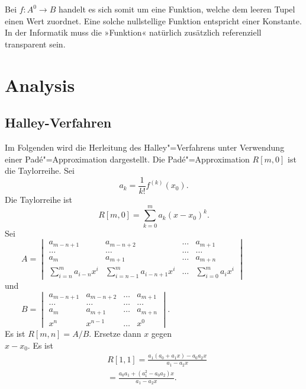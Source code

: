 \documentclass[a4paper,10pt,fleqn,twocolumn,twoside]{scrartcl}
\numberwithin{equation}{section}
\theoremstyle{rmbox}
\begin{document}
Bei $f\colon A^0\to B$ handelt es sich somit um eine Funktion, welche
dem leeren Tupel einen Wert zuordnet. Eine solche nullstellige
Funktion entspricht einer Konstante. In der Informatik muss die
»Funktion« natürlich zusätzlich referenziell transparent sein.

\section{Analysis}
\subsection{Halley-Verfahren}
Im Folgenden wird die Herleitung des Halley"=Verfahrens unter
Verwendung einer Padé"=Approximation dargestellt.
Die Padé"=Approximation $R[m,0]$ ist die Taylorreihe. Sei
\begin{equation}
a_k = \frac{1}{k!} f^{(k)}(x_0).
\end{equation}
Die Taylorreihe ist
\begin{equation}
R[m,0] = \sum_{k=0}^m a_k(x-x_0)^k.
\end{equation}
Sei\\
$\mbox{}\qquad A=\begin{vmatrix}
a_{m-n+1} & a_{m-n+2} & \ldots & a_{m+1}\\
\ldots & \ldots & \ldots & \ldots\\
a_m & a_{m+1} & \ldots & a_{m+n}\\
\sum\limits_{i=n}^m a_{i-n}x^i &
\sum\limits_{i=n-1}^m a_{i-n+1}x^i
&\ldots & \sum\limits_{i=0}^m a_i x^i
\end{vmatrix}$\\
und\\
$\mbox{}\qquad B=\begin{vmatrix}
a_{m-n+1} & a_{m-n+2} & \ldots & a_{m+1}\\
\ldots &\ldots &\ldots &\ldots\\
a_m & a_{m+1} &\ldots & a_{m+n}\\
x^n & x^{n-1} &\ldots & x^0
\end{vmatrix}$.\\
Es ist $R[m,n]=A/B$.
Ersetze dann $x$ gegen\\
$x-x_0$. Es ist
\begin{equation}
\begin{split}
& R[1,1] = \frac{a_1(a_0+a_1 x)-a_0a_2x}{a_1-a_2x}\\
& = \frac{a_0a_1+(a_1^2-a_0a_2)x}{a_1-a_2x}.
\end{split}
\end{equation}
\end{document}
